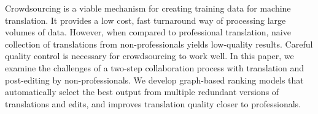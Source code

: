 Crowdsourcing is a viable mechanism for creating training data for machine translation. It provides a low cost, fast turnaround way of processing large volumes of data. However, when compared to professional translation, naive collection of translations from non-professionals yields low-quality results. Careful quality control is necessary for crowdsourcing to work well. In this paper, we examine the challenges of a two-step collaboration process with translation and post-editing by non-professionals. We develop graph-based ranking models that automatically select the best output from multiple redundant versions of translations and edits, and improves translation quality closer to professionals.
